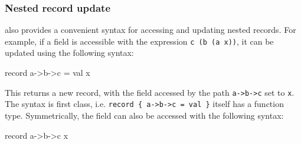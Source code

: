 \subsubsection*{Nested record update}

\Idris{} also provides a convenient syntax for accessing and updating nested
records. For example, if a field is accessible with the expression
\texttt{c (b (a x))}, it can be updated using the following syntax:

\begin{code}
record { a->b->c = val } x 
\end{code}

\noindent
This returns a new record, with the field accessed by the path 
\texttt{a->b->c} set to \texttt{x}. The syntax is first class, i.e.
\texttt{record \{ a->b->c = val \}} itself has a function type.
Symmetrically, the field can also be accessed with the following syntax:

\begin{code}
record { a->b->c } x
\end{code}



